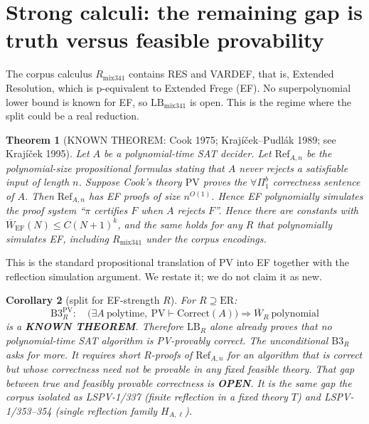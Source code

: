 \documentclass[11pt]{article}
\newtheorem{theorem}{Theorem}
\newtheorem{corollary}[theorem]{Corollary}
\theoremstyle{definition}
\newcommand{\Wbar}{\overline W}
\begin{document}
\section{Strong calculi: the remaining gap is truth versus feasible provability}
The corpus calculus $R_{\mathrm{mix341}}$ contains RES and VARDEF, that is, Extended Resolution, which is p-equivalent to Extended Frege (EF).
No superpolynomial lower bound is known for EF, so $\mathrm{LB}_{\mathrm{mix341}}$ is open.
This is the regime where the split could be a real reduction.

\begin{theorem}[KNOWN THEOREM: Cook 1975; Krajíček--Pudlák 1989; see Krajíček 1995]\label{thm:pv}
Let $A$ be a polynomial-time SAT decider.
Let $\mathrm{Ref}_{A,n}$ be the polynomial-size propositional formulas stating that $A$ never rejects a satisfiable input of length $n$.
Suppose Cook's theory $\mathrm{PV}$ proves the $\forall\Pi^b_1$ correctness sentence of $A$.
Then $\mathrm{Ref}_{A,n}$ has EF proofs of size $n^{O(1)}$.
Hence EF polynomially simulates the proof system ``$\pi$ certifies $F$ when $A$ rejects $F$''.
Hence there are constants with $\Wbar_{\mathrm{EF}}(N)\le C(N+1)^k$, and the same holds for any $R$ that polynomially simulates EF, including $R_{\mathrm{mix341}}$ under the corpus encodings.
\end{theorem}
\noindent This is the standard propositional translation of $\mathrm{PV}$ into EF together with the reflection simulation argument.
We restate it; we do not claim it as new.

\begin{corollary}[split for EF-strength $R$]\label{cor:split}
For $R\supseteq\mathrm{ER}$:
\[
\mathrm{B3}^{\mathrm{PV}}_R:\quad\bigl(\exists A\ \text{polytime},\ \mathrm{PV}\vdash \mathrm{Correct}(A)\bigr)\Longrightarrow \Wbar_R\ \text{polynomial}
\]
is a \textbf{KNOWN THEOREM}.
Therefore $\mathrm{LB}_R$ alone already proves that no polynomial-time SAT algorithm is \emph{PV-provably} correct.
The unconditional $\mathrm{B3}_R$ asks for more.
It requires short $R$-proofs of $\mathrm{Ref}_{A,n}$ for an algorithm that is \emph{correct} but whose correctness need not be provable in any fixed feasible theory.
That gap between true and feasibly provable correctness is \textbf{OPEN}.
It is the same gap the corpus isolated as LSPV-1/337 (finite reflection in a fixed theory $T$) and LSPV-1/353--354 (single reflection family $H_{A,\ell}$).
\end{corollary}
\end{document}
